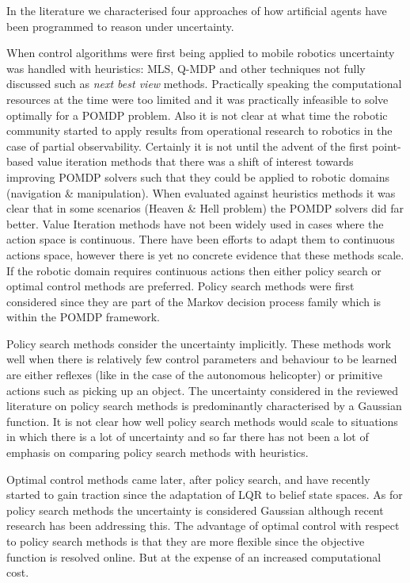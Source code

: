 In the literature we characterised four approaches of how artificial agents have been programmed to reason under uncertainty. 

When control algorithms were first being applied to mobile robotics uncertainty was handled with heuristics: 
MLS, Q-MDP and other techniques not fully discussed such as \textit{next best view} methods. Practically speaking 
the computational resources at the time were too limited and it was practically infeasible to solve optimally for a POMDP problem. 
Also it is not clear at what time the robotic community started to apply results from operational research to robotics
in the case of partial observability.
Certainly it is not until the advent of the first point-based value iteration methods that there was a shift of interest 
towards improving POMDP solvers such that they could be applied to robotic domains (navigation \& manipulation). 
When evaluated against heuristics methods it was clear that in some scenarios (Heaven \& Hell problem) 
the POMDP solvers did far better. Value Iteration methods have not been widely used in cases where the action space 
is continuous. There have been efforts to adapt them to continuous actions space, however there is yet no concrete evidence 
that these methods scale. If the robotic domain requires continuous actions then either policy search or optimal control 
methods are preferred. Policy search methods were first considered since they are part of the Markov decision process 
family which is within the POMDP framework.

Policy search methods consider the uncertainty implicitly. These methods work 
well when there is relatively few control parameters and behaviour to be learned are either reflexes (like in the case of 
the autonomous helicopter) or primitive actions such as picking up an object. The uncertainty considered 
in the reviewed literature on policy search methods is predominantly characterised by a Gaussian function. It is not clear 
how well policy search methods would scale to situations in which there is a lot of uncertainty and so far there has not 
been a lot of emphasis on comparing policy search methods with heuristics. 

Optimal control methods came later, after policy search, and have recently started to gain traction since the adaptation 
of LQR to belief state spaces. As for policy search methods the uncertainty is considered Gaussian although recent research 
has been addressing this. The advantage of optimal control with respect to policy search methods is that they are more 
flexible since the objective function is resolved online. But at the expense of an increased computational cost.

